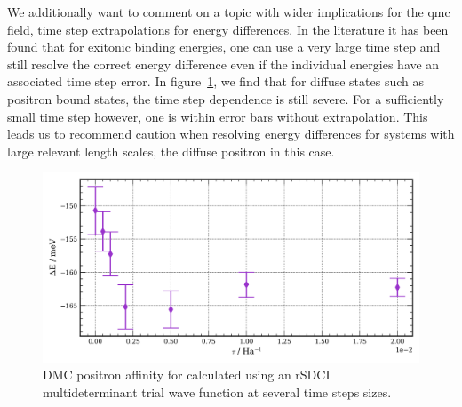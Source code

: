We additionally want to comment on a topic with wider implications for the \gls{qmc} field, time step extrapolations for energy differences.
In the literature it has been found that for exitonic binding energies, one can use a very large time step and still resolve the correct energy difference even if the individual energies have an associated time step error.\cite{10.1103/PhysRevB.98.075122}
In figure~\ref{fig:be_e_diff_ts}, we find that for diffuse states such as positron bound states, the time step dependence is still severe.
For a sufficiently small time step however, one is within error bars without extrapolation.
This leads us to recommend caution when resolving energy differences for systems with large relevant length scales, the diffuse positron in this case.

\begin{figure}
    \caption{\label{fig:be_e_diff_ts} DMC positron affinity for  calculated using an rSDCI multideterminant trial wave function at several time steps sizes. }
    \includegraphics[width=\columnwidth,keepaspectratio]{Images/chapter5/be_rSDCI_multidet.png}
\end{figure}



